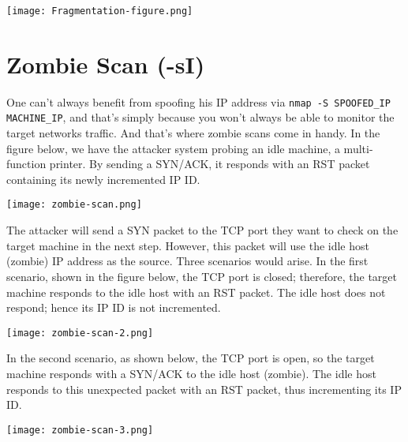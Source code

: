\documentclass[11pt,a4paper]{article}
\begin{document}
\begin{center}
  \texttt{[image: Fragmentation-figure.png]}
  \label{fig:Fragmentation}
\end{center}

\section{Zombie Scan (-sI)}
One can't always benefit from spoofing his IP address via \texttt{nmap -S SPOOFED\_IP MACHINE\_IP}, and that's simply because you won't always be able to monitor the target networks traffic. And that's where zombie scans come in handy.
In the figure below, we have the attacker system probing an idle machine, a multi-function printer. By sending a SYN/ACK, it responds with an RST packet containing its newly incremented IP ID.

\begin{center}
  \texttt{[image: zombie-scan.png]}
  \label{fig:Zombie-scan}
\end{center}

The attacker will send a SYN packet to the TCP port they want to check on the target machine in the next step. However, this packet will use the idle host (zombie) IP address as the source. Three scenarios would arise. In the first scenario, shown in the figure below, the TCP port is closed; therefore, the target machine responds to the idle host with an RST packet. The idle host does not respond; hence its IP ID is not incremented.

\begin{center}
  \texttt{[image: zombie-scan-2.png]}
  \label{fig:Zombie-scan-2}
\end{center}

In the second scenario, as shown below, the TCP port is open, so the target machine responds with a SYN/ACK to the idle host (zombie). The idle host responds to this unexpected packet with an RST packet, thus incrementing its IP ID.

\begin{center}
  \texttt{[image: zombie-scan-3.png]}
  \label{fig:Zombie-scan-3}
\end{center}
\end{document}
